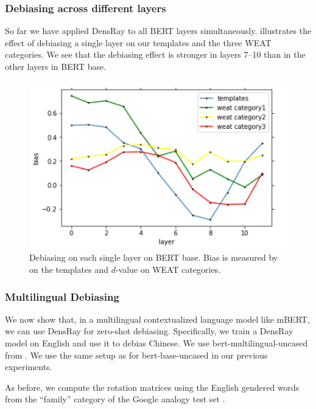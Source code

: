\subsubsection{Debiasing across different layers}
So far we have applied DensRay to all BERT layers simultaneously.
    illustrates the effect of
 debiasing a single  layer on our templates and the three
 WEAT categories. We see that the debiasing effect
is stronger in
layers 7--10  than in the other layers in BERT base.
\begin{figure}[ht]
	\centering
	\includegraphics[width=0.9\linewidth]{layers_base}
	\caption{Debiasing on each single layer on BERT base. Bias is measured by  on the templates and $d$-value on WEAT categories.}
\end{figure}

\subsubsection{Multilingual Debiasing}
We now show that, in a multilingual contextualized language
model like mBERT,
we can use DensRay  for zero-shot debiasing.
Specifically, we train a DensRay model on English and use it
to debias Chinese.
We use  bert-multilingual-uncased from
. We  use the same setup as
for bert-base-uncased in our previous experiments. 

As before, we compute the rotation matrices using the English gendered words from the ``family'' category of the Google analogy test set .


